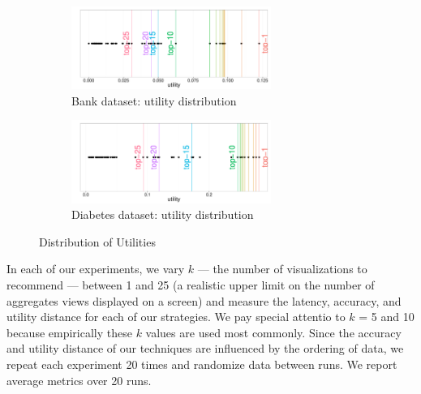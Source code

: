 \begin{figure}[h]
	\centering
	\begin{subfigure}{1\linewidth}
		\centering
		\includegraphics[width=6.5cm]
		{Images/bank_utility_distribution.pdf}
		\vspace{-5pt}
		\caption{Bank dataset: utility distribution}
		\label{fig:bank_utility_distribution}
	\end{subfigure}
	
	\begin{subfigure}{1\linewidth}
		\centering
		\includegraphics[width=6.5cm]
		{Images/diabetes_utility_distribution.pdf}
		\vspace{-5pt}
		\caption{Diabetes dataset: utility distribution}
		\label{fig:diabetes_utility_distribution}
	\end{subfigure}

\vspace{-10pt}
\label{fig:utility_distribution}
\caption{Distribution of Utilities}
\vspace{-15pt}
\end{figure}

In each of our experiments, we vary $k$ --- the number of visualizations to recommend --- between
1 and 25 (a realistic upper limit on the number of aggregates views displayed on a screen)
and measure the latency, accuracy, and utility distance for each of our
strategies. 
We pay special attentio to $k$ = 5 and 10 because empirically these $k$ values are used most commonly.
Since the accuracy and utility distance of our techniques are influenced by the
ordering of data, we repeat each experiment 20
times and randomize data between runs. We report average
metrics over 20 runs.

